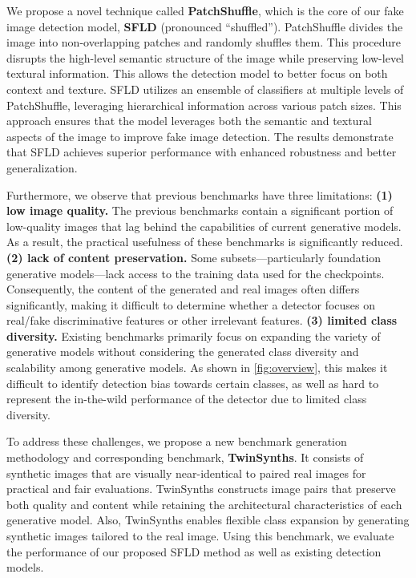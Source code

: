 We propose a novel technique called \textbf{PatchShuffle}, which is the core of our fake image detection model, \textbf{SFLD} (pronounced ``shuffled'').
PatchShuffle divides the image into non-overlapping patches and randomly shuffles them.
This procedure disrupts the high-level semantic structure of the image while preserving low-level textural information. 
This allows the detection model to better focus on both context and texture.
SFLD utilizes an ensemble of classifiers at multiple levels of PatchShuffle, leveraging hierarchical information across various patch sizes.
This approach ensures that the model leverages both the semantic and textural aspects of the image to improve fake image detection.
The results demonstrate that SFLD achieves superior performance with enhanced robustness and better generalization.

Furthermore, we observe that previous benchmarks have three limitations:
\textbf{(1) low image quality.}
The previous benchmarks contain a significant portion of low-quality images that lag behind the capabilities of current generative models.
As a result, the practical usefulness of these benchmarks is significantly reduced.
\textbf{(2) lack of content preservation.}
Some subsets---particularly foundation generative models---lack access to the training data used for the checkpoints.
Consequently, the content of the generated and real images often differs significantly, making it difficult to determine whether a detector focuses on real/fake discriminative features or other irrelevant features. 
\textbf{(3) limited class diversity.}
Existing benchmarks primarily focus on expanding the variety of generative models without considering the generated class diversity and scalability among generative models.
As shown in \cref{fig:overview}, this makes it difficult to identify detection bias towards certain classes, as well as hard to represent the in-the-wild performance of the detector due to limited class diversity.

To address these challenges, we propose a new benchmark generation methodology and corresponding benchmark, \textbf{TwinSynths}.
It consists of synthetic images that are visually near-identical to paired real images for practical and fair evaluations.
TwinSynths constructs image pairs that preserve both quality and content while retaining the architectural characteristics of each generative model.
Also, TwinSynths enables flexible class expansion by generating synthetic images tailored to the real image. 
Using this benchmark, we evaluate the performance of our proposed SFLD method as well as existing detection models.

